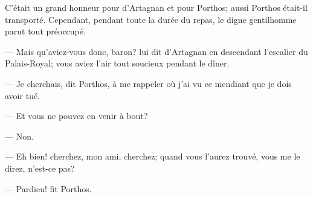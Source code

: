 C'était un grand honneur pour d'Artagnan et pour Porthos; aussi Porthos était-il transporté. Cependant, pendant toute la durée du repas, le digne gentilhomme parut tout préoccupé.

— Mais qu'aviez-vous donc, baron? lui dit d'Artagnan en descendant l'escalier du Palais-Royal; vous aviez l'air tout soucieux pendant le dîner.

— Je cherchais, dit Porthos, à me rappeler où j'ai vu ce mendiant que je dois avoir tué.

— Et vous ne pouvez en venir à bout?

— Non.

— Eh bien! cherchez, mon ami, cherchez; quand vous l'aurez trouvé, vous me le direz, n'est-ce pas?

— Pardieu! fit Porthos.